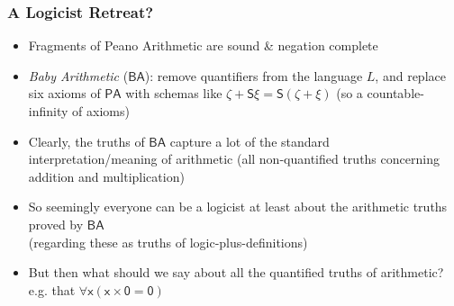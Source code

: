 \begin{frame}
\frametitle{A Logicist Retreat?}

\begin{itemize}[<+->]

\item Fragments of Peano Arithmetic are sound \& negation complete

\item \emph{Baby Arithmetic} ($\mathsf{BA}$): remove quantifiers from the language $L$, and replace six axioms of $\mathsf{PA}$ with schemas like $\mathsf{\zeta + S\xi = S(\zeta +\xi)}$ (so a countable-infinity of axioms)

\item Clearly, the truths of $\mathsf{BA}$ capture a lot of the standard interpretation/meaning of arithmetic (all non-quantified truths concerning addition and multiplication)

\item So seemingly everyone can be a logicist at least about the arithmetic truths proved by $\mathsf{BA}$ \\ (regarding these as truths of logic-plus-definitions)

\item But then what should we say about all the quantified truths of arithmetic? e.g. that $\mathsf{\forall x (x \times 0 = 0)}$

\end{itemize}
\end{frame}

